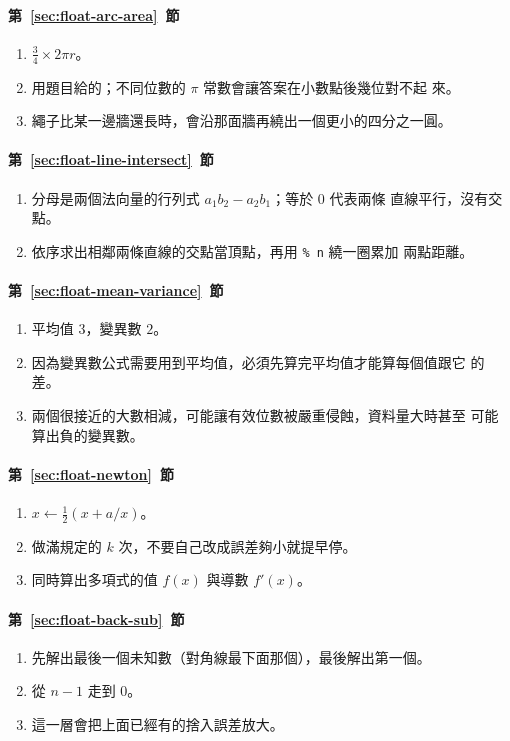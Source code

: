 \paragraph{第~\ref{sec:float-arc-area}~節}
\begin{enumerate}
\item $\frac{3}{4} \times 2\pi r$。
\item 用題目給的；不同位數的 $\pi$ 常數會讓答案在小數點後幾位對不起
來。
\item 繩子比某一邊牆還長時，會沿那面牆再繞出一個更小的四分之一圓。
\end{enumerate}

\paragraph{第~\ref{sec:float-line-intersect}~節}
\begin{enumerate}
\item 分母是兩個法向量的行列式 $a_1 b_2 - a_2 b_1$；等於 $0$ 代表兩條
直線平行，沒有交點。
\item 依序求出相鄰兩條直線的交點當頂點，再用 \texttt{\% n} 繞一圈累加
兩點距離。
\end{enumerate}

\paragraph{第~\ref{sec:float-mean-variance}~節}
\begin{enumerate}
\item 平均值 $3$，變異數 $2$。
\item 因為變異數公式需要用到平均值，必須先算完平均值才能算每個值跟它
的差。
\item 兩個很接近的大數相減，可能讓有效位數被嚴重侵蝕，資料量大時甚至
可能算出負的變異數。
\end{enumerate}

\paragraph{第~\ref{sec:float-newton}~節}
\begin{enumerate}
\item $x \leftarrow \frac{1}{2}(x + a/x)$。
\item 做滿規定的 $k$ 次，不要自己改成誤差夠小就提早停。
\item 同時算出多項式的值 $f(x)$ 與導數 $f'(x)$。
\end{enumerate}

\paragraph{第~\ref{sec:float-back-sub}~節}
\begin{enumerate}
\item 先解出最後一個未知數（對角線最下面那個），最後解出第一個。
\item 從 $n-1$ 走到 $0$。
\item 這一層會把上面已經有的捨入誤差放大。
\end{enumerate}
